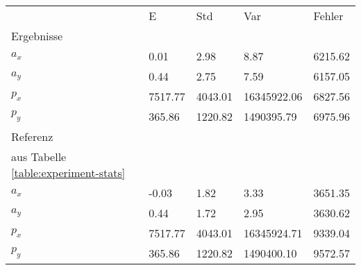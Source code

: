 \begin{tabular}{l|l|l|l|l}

     & E   & Std    & Var    & Fehler \\
\hhline{=|=|=|=|=}

Ergebnisse & & & & \\
$a_x$  &         0.01 &         2.98 &         8.87 &      6215.62 \\
$a_y$  &         0.44 &         2.75 &         7.59 &      6157.05 \\
$p_x$  &      7517.77 &      4043.01 &  16345922.06 &      6827.56 \\
$p_y$  &       365.86 &      1220.82 &   1490395.79 &      6975.96 \\

\hline
Referenz & & & & \\
aus Tabelle  \ref{table:experiment-stats} & & & & \\
$a_x$  &        -0.03 &         1.82 &         3.33 &      3651.35 \\
$a_y$  &         0.44 &         1.72 &         2.95 &      3630.62 \\
$p_x$  &      7517.77 &      4043.01 &  16345924.71 &      9339.04 \\
$p_y$  &       365.86 &      1220.82 &   1490400.10 &      9572.57 \\
\end{tabular}
